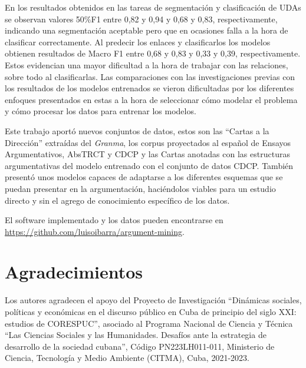 \documentclass{rcci} %
\begin{document}
En los resultados obtenidos en las tareas de segmentaci\'on y clasificaci\'on de UDAs se observan
valores 50\%F1 entre 0,82 y 0,94 y 0,68 y 0,83, respectivamente, indicando una segmentaci\'on aceptable 
pero que en ocasiones falla a la hora de clasificar correctamente. Al predecir los enlaces y clasificarlos 
los modelos obtienen resultados de Macro F1 entre 0,68 y 0,83 y 0,33 y 0,39, respectivamente. Estos evidencian
una mayor dificultad a la hora de trabajar con las relaciones, sobre todo al clasificarlas. 
Las comparaciones con las investigaciones previas con los resultados de los modelos entrenados 
se vieron dificultadas por los diferentes enfoques presentados en estas a la hora de seleccionar 
c\'omo modelar el problema y c\'omo procesar los datos para entrenar los modelos.

Este trabajo aport\'o nuevos conjuntos de datos, estos son las ``Cartas a la Direcci\'on'' extra\'idas del \textit{Granma},
los corpus proyectados al espa\~nol de Ensayos Argumentativos, AbsTRCT y CDCP y las Cartas 
anotadas con las estructuras argumentativas del modelo entrenado con el conjunto de datos CDCP. Tambi\'en
present\'o unos modelos capaces de adaptarse a los diferentes esquemas que se puedan presentar en la argumentaci\'on,
haci\'endolos viables para un estudio directo y sin el agrego de conocimiento espec\'ifico de los datos.

El software implementado y los datos pueden encontrarse en \url{https://github.com/luisoibarra/argument-mining}.

\section*{\fontsize{12}{15}\selectfont Agradecimientos}

Los autores agradecen el apoyo del Proyecto de Investigaci\'on 
``Din\'amicas sociales, pol\'iticas y econ\'omicas en el discurso p\'ublico 
en Cuba de principio del siglo XXI: estudios de CORESPUC'', 
asociado al Programa Nacional de Ciencia y T\'ecnica ``Las Ciencias Sociales y las Humanidades. 
Desaf\'ios ante la estrategia de desarrollo de la sociedad cubana'', C\'odigo PN223LH011-011, Ministerio
de Ciencia, Tecnolog\'ia y Medio Ambiente (CITMA), Cuba, 2021-2023.


\end{document}
